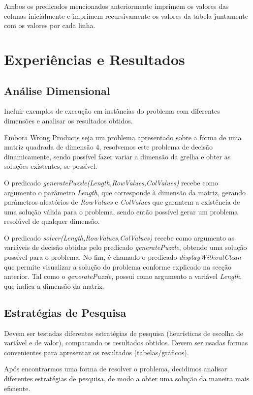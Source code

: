 \documentclass[11pt]{article}
\begin{document}
Ambos os predicados mencionados anteriormente imprimem os valores das colunas inicialmente
e imprimem recursivamente os valores da tabela juntamente com os valores por cada linha.

\section{Experiências e Resultados}

\subsection{Análise Dimensional} Incluir exemplos de execução em instâncias do problema com
diferentes dimensões e analisar os resultados obtidos.

Embora Wrong Products seja um problema apresentado sobre a forma de uma matriz quadrada de 
dimensão 4, resolvemos este problema de decisão dinamicamente, sendo possível fazer variar a 
dimensão da grelha e obter as soluções existentes, se possível.

O predicado \emph{generatePuzzle(Length,RowValues,ColValues)} recebe como argumento o parâmetro \emph{Length}, que corresponde à dimensão da matriz, gerando parâmetros aleatórios de \emph{RowValues} e \emph{ColValues} que garantem a existência de uma solução válida para o problema, sendo então possível gerar um problema resolúvel de qualquer dimensão.

O predicado \emph{solver(Length,RowValues,ColValues)} recebe como argumento as variáveis de decisão obtidas pelo predicado \emph{generatePuzzle}, obtendo uma solução possível para o problema. No fim, é chamado o predicado \emph{displayWithoutClean} que permite visualizar a solução do problema conforme explicado na secção anterior. Tal como o \emph{generatePuzzle}, possui como argumento a variável \emph{Length}, que indica a dimensão da matriz.

\subsection{Estratégias de Pesquisa} Devem ser testadas diferentes estratégias de pesquisa
(heurísticas de escolha de variável e de valor), comparando os resultados obtidos.
Devem ser usadas formas convenientes para apresentar os resultados (tabelas/gráficos).

Após encontrarmos uma forma de resolver o problema, decidimos analisar diferentes estratégias de pesquisa, de modo a obter uma solução da maneira mais eficiente.
\end{document}
